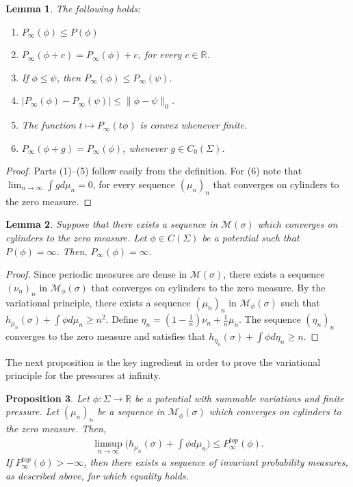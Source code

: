 \documentclass[letterpaper,11pt]{amsart}
\theoremstyle{plain}
\theoremstyle{plain}
\newtheorem{proposition}{Proposition}[subsection]
\newtheorem{lemma}[proposition]{Lemma}
\theoremstyle{definition}
\theoremstyle{remark}
\def\R{{\mathbb R}}
\def\M{{\mathcal M}}
\begin{document}
\begin{lemma}\label{convex}  The following holds:
\begin{enumerate}
\item $P_\infty(\phi )\le P(\phi )$
\item $P_\infty(\phi +c)=P_\infty(\phi )+c$, for every $c\in \R$. 
\item If $\phi \le \psi$, then $P_\infty(\phi )\le P_\infty(\psi)$.
\item $|P_\infty(\phi )-P_\infty(\psi)|\le \|\phi -\psi\|_0$.
\item The function $t\mapsto P_\infty(t\phi )$ is convex whenever finite.
\item $P_\infty(\phi +g)=P_\infty(\phi )$, whenever $g\in C_0(\Sigma)$. 
\end{enumerate}
\end{lemma}
\begin{proof} Parts (1)--(5) follow easily from the definition. For (6) note that $\lim_{n\to\infty} \int gd\mu_n=0$, for every sequence $(\mu_n)_n$ that converges on cylinders to the zero measure. 
\end{proof}

\begin{lemma}\label{lem:infpre} Suppose that there exists a sequence in $\M(\sigma)$ which converges on cylinders to the zero measure. Let $\phi\in C(\Sigma)$ be a potential such that $P(\phi)=\infty$. Then, $P_\infty(\phi)=\infty$. 
\end{lemma}
\begin{proof}
Since periodic measures are dense in $\M(\sigma)$, there exists a sequence $(\nu_n)_n$  in $\M_\phi(\sigma)$ that converges on cylinders to the zero measure. By the variational principle, there exists a sequence $(\mu_n)_n$ in $\M_\phi(\sigma)$ such that $h_{\mu_n}(\sigma)+\int \phi d\mu_n\ge n^2$. Define $\eta_n=(1-\frac{1}{n})\nu_n+\frac{1}{n}\mu_n$. The sequence $(\eta_n)_n$ converges to the zero measure and satisfies that $h_{\eta_n}(\sigma)+\int \phi d\eta_n\ge n$.
\end{proof}

The next proposition is the key ingredient in order to prove the variational principle for the pressures at infinity. 

\begin{proposition}\label{presinf} Let $\phi:\Sigma\to\R$ be a potential with summable variations and finite pressure. Let $(\mu_n)_n$ be a sequence in $\M_\phi(\sigma)$ which converges on cylinders to the zero measure. Then, \begin{align}\label{y1}\limsup_{n\to\infty} \bigg(h_{\mu_n}(\sigma)+\int \phi d\mu_n\bigg)\le P^{top}_\infty(\phi ).\end{align}
If $P^{top}_\infty(\phi )>-\infty$, then there exists a sequence of invariant probability measures, as described above, for which equality holds.
\end{proposition}
\end{document}
